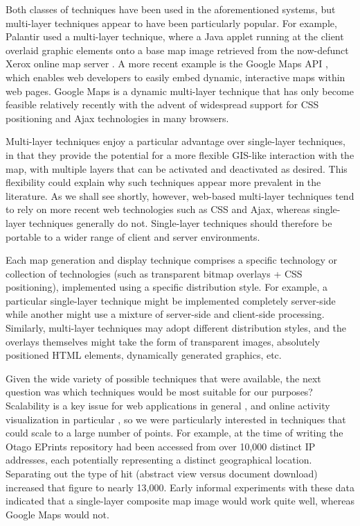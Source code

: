 \documentclass[acmnow]{acmtrans2m}
\begin{document}
Both classes of techniques have been used in the aforementioned systems,
but multi-layer techniques appear to have been particularly popular. For
example, Palantir used a multi-layer technique, where a Java applet running
at the client overlaid graphic elements onto a base map image retrieved
from the now-defunct Xerox online map server
\cite{Papa-N-1998-Palantir}. A more recent example is the Google Maps
API \cite{Goog-M-2006-maps}, which enables web developers to easily
embed dynamic, interactive maps within web pages. Google Maps is a
dynamic multi-layer technique that has only become feasible relatively
recently with the advent of widespread support for CSS positioning and
Ajax technologies in many browsers.

Multi-layer techniques enjoy a particular advantage over single-layer
techniques, in that they provide the potential for a more flexible
GIS-like interaction with the map, with multiple layers that can be
activated and deactivated as desired. This flexibility could explain why
such techniques appear more prevalent in the literature. As we shall see
shortly, however, web-based multi-layer techniques tend to rely on more
recent web technologies such as CSS and Ajax, whereas single-layer
techniques generally do not. Single-layer techniques should therefore be
portable to a wider range of client and server environments.

Each map generation and display technique comprises a specific
technology or collection of technologies (such as transparent bitmap
overlays + CSS positioning), implemented using a specific distribution
style. For example, a particular single-layer technique might be
implemented completely server-side while another might use a mixture of
server-side and client-side processing. Similarly, multi-layer
techniques may adopt different distribution styles, and the overlays
themselves might take the form of transparent images, absolutely
positioned HTML elements, dynamically generated graphics, etc.

Given the wide variety of possible techniques that were available, the
next question was which techniques would be most suitable for our
purposes? Scalability is a key issue for web applications in general
\cite[p.\ 28]{Offu-J-2002-quality}, and online activity visualization in
particular \cite[p.\ 50]{Eick-SG-2001-sitevis}, so we were particularly
interested in techniques that could scale to a large number of points.
For example, at the time of writing the Otago EPrints repository had
been accessed from over 10,000 distinct IP addresses, each potentially
representing a distinct geographical location. Separating out the type
of hit (abstract view versus document download) increased that figure to
nearly 13,000. Early informal experiments with these data indicated that
a single-layer composite map image would work quite well, whereas Google
Maps would not.
\end{document}
